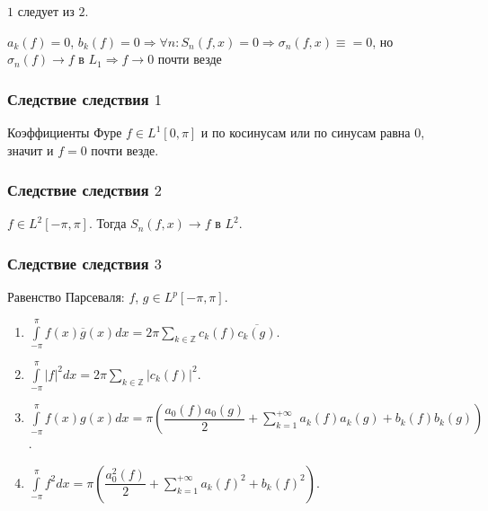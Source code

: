 \documentclass{article}
\begin{document}
                    $1$ следует из $2$.
                    
                    $a_k(f) = 0$, $b_k(f) = 0 \Rightarrow \forall n : S_n(f, x) = 0 \Rightarrow \sigma_n(f, x) \equiv = 0$, но $\sigma_n(f) \rightarrow f$ в $L_1 \Rightarrow f \rightarrow 0$ почти везде
            
                \subsubsection{Следствие следствия $1$}
                
                    Коэффициенты Фуре $f \in L^1 [0, \pi]$ и по косинусам или по синусам равна 0, значит и $f = 0$ почти везде.
                    
                \subsubsection{Следствие следствия $2$}
                
                    $f \in L^2 [-\pi, \pi]$. Тогда $S_n(f, x) \rightarrow f$ в $L^2$.
                    
                \subsubsection{Следствие следствия $3$}
                
                    Равенство Парсеваля: $f$, $g \in L^p [-\pi, \pi]$.
                    
                    \begin{enumerate}
                    
                        \item $\int\limits^{\pi}_{-\pi} f(x) \overline{g}(x) dx = 2 \pi \sum\limits_{k \in \mathbb{Z}} c_k(f) \overline{c_k (g)}$.
                        
                        \item $\int\limits^{\pi}_{-\pi} |f|^2 dx = 2 \pi \sum\limits_{k \in \mathbb{Z}} |c_k(f)|^2$.
                        
                        \item $\int\limits^{\pi}_{-\pi} f(x) g(x) dx = \pi \left( \dfrac{a_0(f) a_0(g)}{2} + \sum\limits_{k = 1}^{+\infty} a_k(f) a_k(g) + b_k(f) b_k(g) \right)$.
                        
                        \item $\int\limits^{\pi}_{-\pi} f^2 dx = \pi \left( \dfrac{a_0^2(f)}{2} + \sum\limits_{k = 1}^{+\infty} a_k(f)^2 + b_k(f)^2 \right)$.
                        
                    \end{enumerate}
                    
\end{document}

